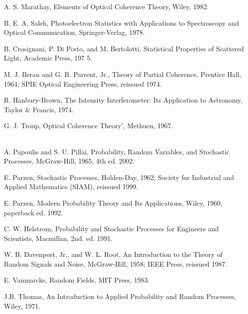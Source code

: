 \documentclass{article}
\numberwithin{figure}{subsection}
\numberwithin{table}{subsection}
\begin{document}
\begin{spacing}{0.5}
\begin{hangparas}{0.25cm}{1}
\par A. S. Marathay, Elements of Optical Coherence Theory, Wiley, 1982.\\
\par B. E. A. Saleh, Photoelectron Statistics with Applications to Spectroscopy and Optical Communication, Springer-Verlag, 1978.\\
\par B. Crosignani, P. Di Porto, and M. Bertolotti, Statistical Properties of Scattered Light, Academic
Press, 197 5.\\
\par M. J. Beran and G. B. Parrent, Jr., Theory of Partial Coherence, Prentice Hall, 1964; SPIE Optical
Engineering Press, reissued 1974.\\
\par R. Hanbury-Brown, The Intensity Interferometer: Its Application to Astronomy, Taylor \& Francis,
1974.\\
\par G. J. Troup, Optical Coherence Theory', Methuen, 1967.\\


\bigbreak{}\\
\par A. Papoulis and S. U. Pillai, Probability, Random Variables, and Stochastic Processes, McGraw-Hill,
1965, 4th ed. 2002.\\
\par E. Parzen, Stochastic Processes, Holden-Day, 1962; Society for Industrial and Applied Mathematics
(SIAM), reissued 1999.\\
\par E. Parzen, Modern Probability Theory and Its Applications, Wiley, 1960, paperback ed. 1992.\\
\par C. W. Helstrom, Probability and Stochastic Processes for Engineers and Scientists, Macmillan, 2nd.
ed. 1991.\\
\par W. B. Davenport, Jr., and W. L. Root, An Introduction to the Theory of Random Signals and Noise,
McGraw-Hill, 1958; IEEE Press, reissued 1987.\\
\par E. Vanmarcke, Random Fields, MIT Press, 1983.\\
\par J.B. Thomas, An Introduction to Applied Probability and Random Processes, Wiley, 1971.\\



\end{hangparas}
\end{spacing}
\end{document}
